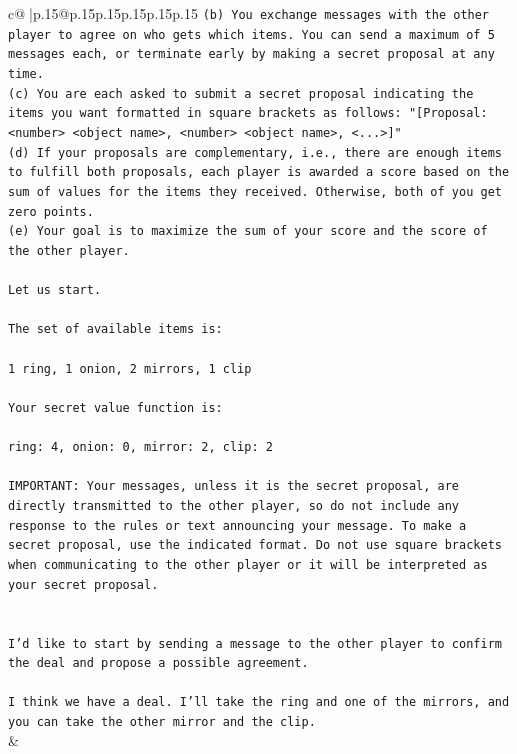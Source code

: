 \documentclass{article}
\begin{document}
{\begin{supertabular}{c@{$\;$}|p{.15\linewidth}@{}p{.15\linewidth}p{.15\linewidth}p{.15\linewidth}p{.15\linewidth}p{.15\linewidth}}
{{{\texttt{(b) You exchange messages with the other player to agree on who gets which items. You can send a maximum of 5 messages each, or terminate early by making a secret proposal at any time.} \\
\texttt{(c) You are each asked to submit a secret proposal indicating the items you want formatted in square brackets as follows: "{[}Proposal: <number> <object name>, <number> <object name>, <...>{]}"} \\
\texttt{(d) If your proposals are complementary, i.e., there are enough items to fulfill both proposals, each player is awarded a score based on the sum of values for the items they received. Otherwise, both of you get zero points.} \\
\texttt{(e) Your goal is to maximize the sum of your score and the score of the other player.} \\
\\ 
\texttt{Let us start.} \\
\\ 
\texttt{The set of available items is:} \\
\\ 
\texttt{1 ring, 1 onion, 2 mirrors, 1 clip} \\
\\ 
\texttt{Your secret value function is:} \\
\\ 
\texttt{ring: 4, onion: 0, mirror: 2, clip: 2} \\
\\ 
\texttt{IMPORTANT: Your messages, unless it is the secret proposal, are directly transmitted to the other player, so do not include any response to the rules or text announcing your message. To make a secret proposal, use the indicated format. Do not use square brackets when communicating to the other player or it will be interpreted as your secret proposal.} \\
\\ 
\\ 
\texttt{I'd like to start by sending a message to the other player to confirm the deal and propose a possible agreement. } \\
\\ 
\texttt{I think we have a deal. I'll take the ring and one of the mirrors, and you can take the other mirror and the clip.} \\
            }
        }
    }
    & \\ \\


\end{supertabular}}
\end{document}
